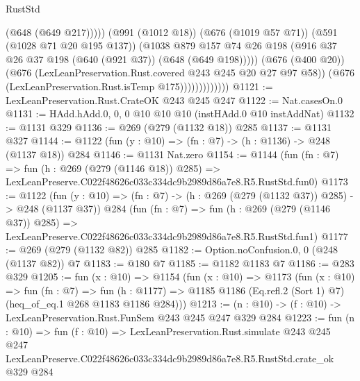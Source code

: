 \begin{lexlean}{RustStd}
\begin{coremodule}
                                  (@648 (@649 @217)))))
                            (@991 (@1012 @18))
                            (@676 (@1019 @57 @71))
                            (@591 (@1028 @71 @20 @195 @137))
                            (@1038
                              @879
                              @157
                              @74
                              @26
                              @198
                              (@916 @37 @26 @37 @198 (@640 (@921 @37)) (@648 (@649 @198)))))
                          (@676 (@400 @20))
                          (@676 (LexLeanPreservation.Rust.covered @243 @245 @20 @27 @97 @58))
                          (@676 (LexLeanPreservation.Rust.isTemp @175)))))))))))))
@1121 := LexLeanPreservation.Rust.CrateOK @243 @245 @247
@1122 := Nat.casesOn.{0}
@1131 := HAdd.hAdd.{0, 0, 0} @10 @10 @10 (instHAdd.{0} @10 instAddNat)
@1132 := @1131 @329
@1136 := @269 (@279 (@1132 @18)) @285
@1137 := @1131 @327
@1144 := @1122 (fun (y : @10) => (fn : @7) -> (h : @1136) -> @248 (@1137 @18)) @284
@1146 := @1131 Nat.zero
@1154 := @1144
    (fun (fn : @7) =>
    fun (h : @269 (@279 (@1146 @18)) @285) =>
    LexLeanPreserve.C022f48626c033c334dc9b2989d86a7e8.R5.RustStd.fun0)
@1173 := @1122
    (fun (y : @10) => (fn : @7) -> (h : @269 (@279 (@1132 @37)) @285) -> @248 (@1137 @37))
    @284
    (fun (fn : @7) =>
    fun (h : @269 (@279 (@1146 @37)) @285) =>
    LexLeanPreserve.C022f48626c033c334dc9b2989d86a7e8.R5.RustStd.fun1)
@1177 := @269 (@279 (@1132 @82)) @285
@1182 := Option.noConfusion.{0, 0} (@248 (@1137 @82)) @7
@1183 := @180 @7
@1185 := @1182 @1183 @7
@1186 := @283 @329
@1205 := fun (x : @10) =>
  @1154
    (fun (x : @10) =>
    @1173
      (fun (x : @10) =>
      fun (fn : @7) =>
      fun (h : @1177) =>
      @1185 @1186 (Eq.refl.{2} (Sort 1) @7) (heq_of_eq.{1} @268 @1183 @1186 @284)))
@1213 := (n : @10) -> (f : @10) -> LexLeanPreservation.Rust.FunSem @243 @245 @247 @329 @284
@1223 := fun (n : @10) =>
  fun (f : @10) =>
  LexLeanPreservation.Rust.simulate
    @243
    @245
    @247
    LexLeanPreserve.C022f48626c033c334dc9b2989d86a7e8.R5.RustStd.crate_ok
    @329
    @284
\end{coremodule}
\end{lexlean}
